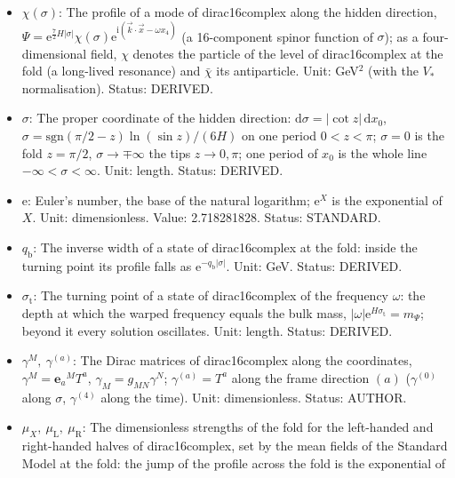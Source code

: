 \documentclass[
  10pt,
]{article}
\providecommand{\tightlist}{%
  \setlength{\itemsep}{0pt}\setlength{\parskip}{0pt}}
\begin{document}
\begin{itemize}
\tightlist
\item
  \(\chi(\sigma)\): The profile of a mode of dirac16complex along the
  hidden direction,
  \(\Psi = \mathrm{e}^{\frac72H\lvert\sigma\rvert}\chi(\sigma)\mathrm{e}^{\mathrm{i}(\vec k\cdot\vec x - \omega x_4)}\)
  (a 16-component spinor function of \(\sigma\)); as a four-dimensional
  field, \(\chi\) denotes the particle of the level of dirac16complex at
  the fold (a long-lived resonance) and \(\bar\chi\) its antiparticle.
  Unit: GeV\(^{2}\) (with the \(V_*\) normalisation). Status: DERIVED.
\item
  \(\sigma\): The proper coordinate of the hidden direction:
  \(\mathrm{d}\sigma = \lvert\cot z\rvert\,\mathrm{d}x_0\),
  \(\sigma = \mathrm{sgn}(\pi/2 - z)\ln(\sin z)/(6H)\) on one period
  \(0 < z < \pi\); \(\sigma = 0\) is the fold \(z = \pi/2\),
  \(\sigma \to \mp\infty\) the tips \(z \to 0, \pi\); one period of
  \(x_0\) is the whole line \(-\infty < \sigma < \infty\). Unit: length.
  Status: DERIVED.
\item
  \(\mathrm{e}\): Euler's number, the base of the natural logarithm;
  \(\mathrm{e}^{X}\) is the exponential of \(X\). Unit: dimensionless.
  Value: 2.718281828. Status: STANDARD.
\item
  \(q_{\mathrm{b}}\): The inverse width of a state of dirac16complex at
  the fold: inside the turning point its profile falls as
  \(\mathrm{e}^{-q_{\mathrm{b}}\lvert\sigma\rvert}\). Unit: GeV. Status:
  DERIVED.
\item
  \(\sigma_{\mathrm{t}}\): The turning point of a state of
  dirac16complex of the frequency \(\omega\): the depth at which the
  warped frequency equals the bulk mass,
  \(\lvert\omega\rvert\mathrm{e}^{H\sigma_{\mathrm{t}}} = m_\Psi\);
  beyond it every solution oscillates. Unit: length. Status: DERIVED.
\item
  \(\gamma^M,\ \gamma^{(a)}\): The Dirac matrices of dirac16complex
  along the coordinates, \(\gamma^M = \mathbf{e}_a{}^MT^a\),
  \(\gamma_M = g_{MN}\gamma^N\); \(\gamma^{(a)} = T^a\) along the frame
  direction \((a)\) (\(\gamma^{(0)}\) along \(\sigma\), \(\gamma^{(4)}\)
  along the time). Unit: dimensionless. Status: AUTHOR.
\item
  \(\mu_X,\ \mu_{\mathrm{L}},\ \mu_{\mathrm{R}}\): The dimensionless
  strengths of the fold for the left-handed and right-handed halves of
  dirac16complex, set by the mean fields of the Standard Model at the
  fold: the jump of the profile across the fold is the exponential of

\end{itemize}
\end{document}
